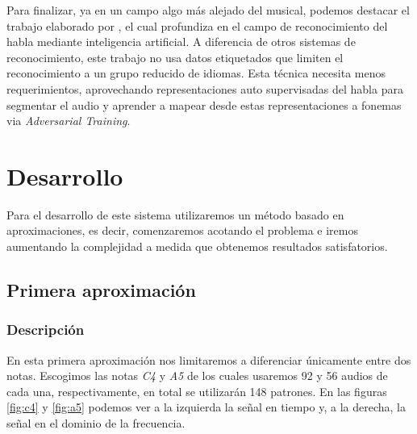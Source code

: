 \documentclass[12pt]{article}
\begin{document}
\bigskip
Para finalizar, ya en un campo algo más alejado del musical, podemos destacar el trabajo elaborado por \cite{baevski2021unsupervised},
el cual profundiza en el campo de reconocimiento del habla mediante inteligencia artificial.
A diferencia de otros sistemas de reconocimiento, este trabajo no usa datos etiquetados que limiten el reconocimiento a un grupo reducido de idiomas. 
Esta técnica necesita menos requerimientos, aprovechando representaciones auto supervisadas del habla para segmentar el audio y aprender a 
mapear desde estas representaciones a fonemas via \textit{Adversarial Training}.

\bigskip

\newpage
\section{Desarrollo}
\label{Desarrollo}
Para el desarrollo de este sistema utilizaremos un método basado en aproximaciones, es decir, comenzaremos acotando el problema e iremos aumentando
la complejidad a medida que obtenemos resultados satisfatorios.
\subsection{Primera aproximación}
\label{Primera aproximación}

\subsubsection{Descripción}
En esta primera aproximación nos limitaremos a diferenciar únicamente entre dos notas. 
Escogimos las notas \textit{C4} y \textit{A5} de los cuales usaremos 92 y 56 audios de cada una, respectivamente, en total
se utilizarán 148 patrones. En las figuras \ref{fig:c4} y \ref{fig:a5} podemos ver a la izquierda la señal en tiempo y, a la derecha,
la señal en el dominio de la frecuencia.
\end{document}
